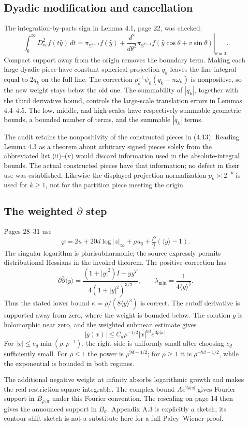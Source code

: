 \documentclass[10pt]{article}
\begin{document}
\subsection*{Dyadic modification and cancellation}
The integration-by-parts sign in Lemma 4.1, page 22, was checked: \[\int_0^\infty D^2_{vv}f(t\widehat y)\,dt
 =\pi_{\mathbb S^{d-1}}f(\widehat y)
  +\left.\frac{d^2}{d\theta^2}
    \pi_{\mathbb S^{d-1}}f(\widehat y\cos\theta+v\sin\theta)
   \right|_{\theta=0}.\] Compact support away from the origin removes the boundary term. Making each large dyadic piece have constant spherical projection \(q_k\) leaves the line integral equal to \(2q_k\) on the full line. The correction \(p_k^{-1}\psi_k(q_k-\pi\omega_k)\) is nonpositive, so the new weight stays below the old one. The summability of \(|q_k|\), together with the third derivative bound, controls the large-scale translation errors in Lemmas 4.4–4.5. The low, middle, and high scales have respectively summable geometric bounds, a bounded number of terms, and the summable \(|q_k|\) terms.\par
The audit retains the nonpositivity of the constructed pieces in (4.13). Reading Lemma 4.3 as a theorem about arbitrary signed pieces solely from the abbreviated list (ii)–(v) would discard information used in the absolute-integral bounds. The actual constructed pieces have that information; no defect in their use was established. Likewise the displayed projection normalization \(p_k\asymp2^{-k}\) is used for \(k\geq1\), not for the partition piece meeting the origin.\par
\subsection*{The weighted \(\bar\partial\) step}
Pages 28–31 use \[\varphi=2u+20d\log|z|_\infty+\rho u_0
              +\frac{\rho}{2}(\langle y\rangle-1).\] The singular logarithm is plurisubharmonic; the source expressly permits distributional Hessians in the invoked theorem. The positive correction has \[\partial\bar\partial\langle y\rangle
 =\frac{(1+|y|^2)I-yy^T}{4(1+|y|^2)^{3/2}},
 \qquad \lambda_{\min}=\frac1{4\langle y\rangle^3}.\] Thus the stated lower bound \(\kappa=\rho/(8\langle y\rangle^3)\) is correct. The cutoff derivative is supported away from zero, where the weight is bounded below. The solution \(g\) is holomorphic near zero, and the weighted submean estimate gives \[|g(x)|\leq C_d\rho^{-1/2}|x|^{9d}e^{3\rho|x|}.\] For \(|x|\leq c_d\min(\rho,\rho^{-1})\), the right side is uniformly small after choosing \(c_d\) sufficiently small. For \(\rho\leq1\) the power is \(\rho^{9d-1/2}\); for \(\rho\geq1\) it is \(\rho^{-9d-1/2}\), while the exponential is bounded in both regimes.\par
The additional negative weight at infinity absorbs logarithmic growth and makes the real restriction square integrable. The complex bound \(Ae^{2\rho|y|}\) gives Fourier support in \(B_{\rho/\pi}\) under this Fourier convention. The rescaling on page 14 then gives the announced support in \(B_\sigma\). Appendix A.3 is explicitly a sketch; its contour-shift sketch is not a substitute here for a full Paley–Wiener proof.\par
\end{document}
